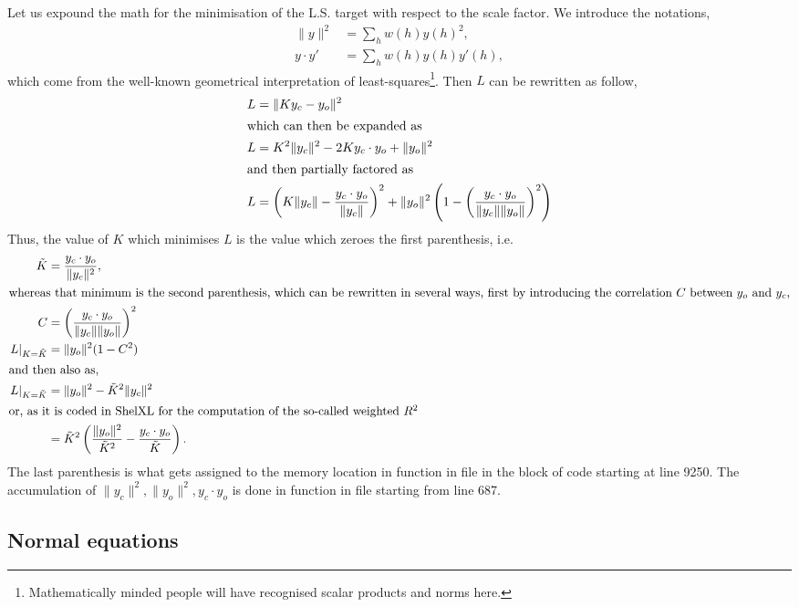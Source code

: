 \documentclass[11pt]{article}
\begin{document}
Let us expound the math for the minimisation of the L.S. target with respect to the scale factor. We introduce the notations,
\begin{align}
\|y\|^2 &= \sum_h w(h)y(h)^2,\\
y \cdot y' &= \sum_h w(h) y(h) y'(h),
\end{align}
which come from the well-known geometrical interpretation of least-squares\footnote{Mathematically minded people will have recognised scalar products and norms here.}. Then $L$ can be rewritten as follow,
\begin{align}
L &= \| K y_c - y_o \|^2
\label{eqn:L:def:geom}\\
\intertext{which can then be expanded as}
L &= K^2 \|y_c\|^2 -2K y_c \cdot y_o + \|y_o\|^2
\label{eqn:L:def:geom:expanded}
\\
\intertext{and then partially factored as}
L &= \left(K \|y_c\| - \frac{y_c \cdot y_o}{\|y_c\|}\right)^2
+  \|y_o\|^2 \left(1 - \left(\frac{y_c \cdot y_o}{\|y_c\| \|y_o\|}\right)^2 \right) \nonumber
\end{align}
Thus, the value of $K$ which minimises $L$ is the value which zeroes the first parenthesis, i.e.
\begin{align}
\tilde{K} &= \frac{y_c \cdot y_o}{\|y_c\|^2},
\label{eqn:min:L:wrt:K}\\
\intertext{whereas that minimum is the second parenthesis, which can be rewritten in several ways, first by introducing the correlation $C$ between $y_o$ and $y_c$,}
C &= \left(\frac{y_c \cdot y_o}{\|y_c\| \|y_o\|}\right)^2 \\
\left. L \right|_{K=\tilde{K}} &= \|y_o\|^2 ( 1 - C^2 ) \\
\intertext{and then also as,}
\left. L \right|_{K=\tilde{K}} &= \|y_o\|^2 - \tilde{K}^2 \|y_c\|^2
\label{eqn:min:L:wrt:K:val}
\\
\intertext{or, as it is coded in ShelXL for the computation of the so-called weighted $R^2$}
&= \tilde{K}^2 \left(\frac{\|y_o\|^2}{\tilde{K}^2} - \frac{y_c \cdot y_o}{\tilde{K}} \right).
\end{align}
The last parenthesis is what gets assigned to the memory location  in function  in file  in the block of code starting at line 9250. The accumulation of $\|y_c\|^2, \|y_o\|^2, y_c \cdot y_o$ is done in function  in file  starting from line 687.

\subsection{Normal equations }
\end{document}

